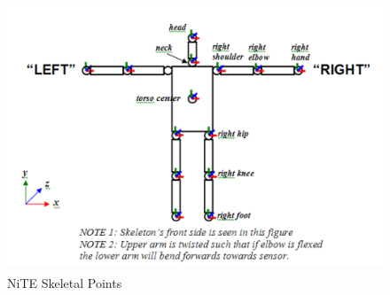 \begin{figure}
	[h] \centering 
	\includegraphics[height=8cm]{figures/content/ni-joints.png} \caption{NiTE Skeletal Points} \label{fg:ni:joints} 
\end{figure}
